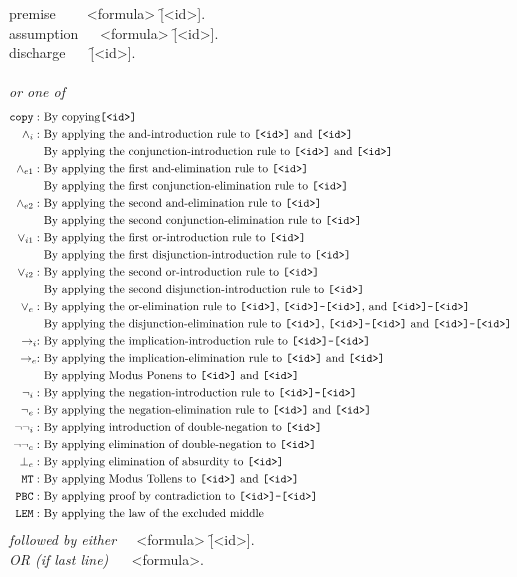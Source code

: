 \documentclass[manual.tex]{subfiles}
\begin{document}
\newcommand{\id}{\f{[<id>]}}
\newcommand{\idd}{\f{\id -\id}}
{\ttfamily
\noindent
premise $~~~~~~~$\tra {} <formula> \id. \\
assumption $~~~~$\tra {} <formula> \id.\\
discharge $~~~~~$\tra {} \id.\\~\\
\emph{or one of}
\vspace{-3mm}
\begin{align*}
\f{copy} :&\txt{ By copying} \id\\
\land_{i} :&\txt{ By applying the and-introduction rule to }\id\txt{ and }\id\\
&\txt{ By applying the conjunction-introduction rule to }\id\txt{ and }\id\\
\land_{e1} :&\txt{ By applying the first and-elimination rule to }\id\\
&\txt{ By applying the first conjunction-elimination rule to }\id\\
\land_{e2} :&\txt{ By applying the second and-elimination rule to }\id\\
&\txt{ By applying the second conjunction-elimination rule to }\id\\
\lor_{i1} :&\txt{ By applying the first or-introduction rule to }\id\\
&\txt{ By applying the first disjunction-introduction rule to }\id\\
\lor_{i2} :&\txt{ By applying the second or-introduction rule to }\id\\
&\txt{ By applying the second disjunction-introduction rule to }\id\\
\lor_e :&\txt{ By applying the or-elimination rule to }\id\txt{, }\idd\txt{, and }\idd\\
&\txt{ By applying the disjunction-elimination rule to }\id\txt{, }\idd\txt{ and }\idd\\
\ra_i  :&\txt{ By applying the implication-introduction rule to }\idd\\
\ra_e :&\txt{ By applying the implication-elimination rule to }\id\txt{ and }\id\\
&\txt{ By applying Modus Ponens to }\id\txt{ and }\id\\
\neg_i :&\txt{ By applying the negation-introduction rule to }\idd\\
\neg_e :&\txt{ By applying the negation-elimination rule to }\id\txt{ and }\id\\
\neg\neg_i :&\txt{ By applying introduction of double-negation to }\id\\
\neg\neg_e :&\txt{ By applying elimination of double-negation to }\id\\
\bot_e :&\txt{ By applying elimination of absurdity to }\id\\
\f{MT} :&\txt{ By applying Modus Tollens to }\id\txt{ and }\id\\
\f{PBC} :&\txt{ By applying proof by contradiction to }\idd\\
\f{LEM} :&\txt{ By applying the law of the excluded middle}
\end{align*}
\emph{followed by either}
$~~~~~$<formula> \id. \\
\emph{OR (if last line)} 
$~~~~~~$<formula>.
}
\end{document}
